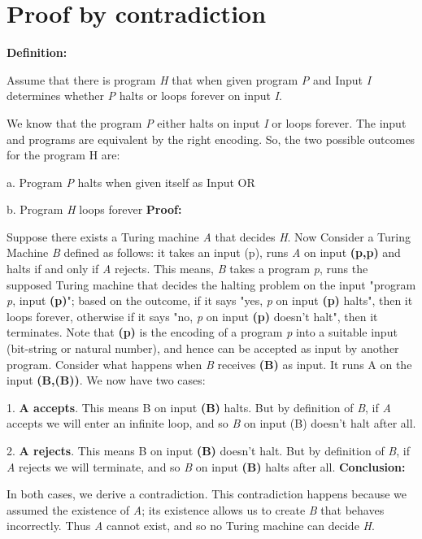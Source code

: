 \documentclass[11pt]{article}
\theoremstyle{plain}
\theoremstyle{definition}
\begin{document}
\section*{Proof by contradiction}
\SetAlgoLined
 \textbf{Definition:} \par Assume that there is program \emph{H} that when given program \emph{P} and Input \emph{I} determines whether \emph{P} halts or loops forever on input \emph{I}. 
 \par We know that the program \emph{P} either halts on input \emph{I} or loops forever. The input and programs are equivalent by the right encoding.
 So, the two possible outcomes for the program H are:
 \par a. Program \emph{P} halts when given itself as Input
 OR
 \par b. Program \emph{H} loops forever
 \newline
 \newline
 \textbf{Proof: \cite{Husfeldt:5}}
 \par Suppose there exists a Turing machine \emph{A} that decides \emph{H}. Now Consider a Turing Machine \emph{B} defined as follows: it takes an input (p), runs \emph{A} on input \textbf{(p,p)} and halts if and only if \emph{A} rejects. This means, \emph{B} takes a program \emph{p}, runs the supposed Turing machine that decides the halting problem on the input "program \emph{p}, input \textbf{(p)}"; based on the outcome, if it says "yes, \emph{p} on input \textbf{(p)} halts", then it loops forever, otherwise if it says "no, \emph{p} on input \textbf{(p)} doesn't halt", then it terminates. Note that \textbf{(p)} is the encoding of a program \emph{p} into a suitable input (bit-string or natural number), and hence can be accepted as input by another program.
 Consider what happens when \emph{B} receives \textbf{(B)} as input. It runs A on the input \textbf{(B,(B))}. We now have two cases:
 \par 1. \textbf{A accepts}. This means B on input \textbf{(B)} halts. But by definition of \emph{B}, if \emph{A} accepts we will enter an infinite loop, and so \emph{B} on input (B) doesn't halt after all.
 \par 2. \textbf{A rejects}. This means B on input \textbf{(B)} doesn't halt. But by definition of \emph{B}, if \emph{A} rejects we will terminate, and so \emph{B} on input \textbf{(B)} halts after all.
 \newline
 \newline
 \textbf{Conclusion:}\par In both cases, we derive a contradiction. This contradiction happens because we assumed the existence of \emph{A}; its existence allows us to create \emph{B} that behaves incorrectly. Thus \emph{A} cannot exist, and so no Turing machine can decide \emph{H}.
\pagebreak
\printbibliography
\end{document}
